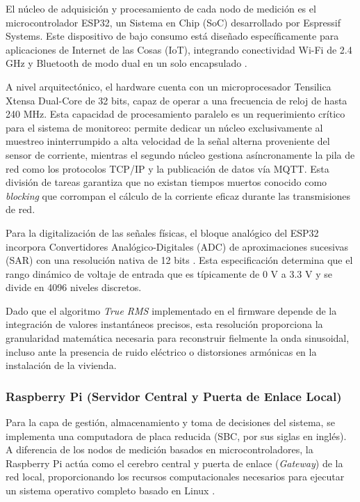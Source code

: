             El núcleo de adquisición y procesamiento de cada nodo de medición es el microcontrolador ESP32, un Sistema en Chip (SoC) desarrollado por Espressif Systems. Este dispositivo de bajo consumo está diseñado específicamente para aplicaciones de Internet de las Cosas (IoT), integrando conectividad Wi-Fi de 2.4 GHz y Bluetooth de modo dual en un solo encapsulado \cite{espressif2023esp32}.

            A nivel arquitectónico, el hardware cuenta con un microprocesador Tensilica Xtensa Dual-Core de 32 bits, capaz de operar a una frecuencia de reloj de hasta 240 MHz. Esta capacidad de procesamiento paralelo es un requerimiento crítico para el sistema de monitoreo: permite dedicar un núcleo exclusivamente al muestreo ininterrumpido a alta velocidad de la señal alterna proveniente del sensor de corriente, mientras el segundo núcleo gestiona asíncronamente la pila de red como los protocolos TCP/IP y la publicación de datos vía MQTT. Esta división de tareas garantiza que no existan tiempos muertos conocido como \textit{blocking} que corrompan el cálculo de la corriente eficaz durante las transmisiones de red.

            Para la digitalización de las señales físicas, el bloque analógico del ESP32 incorpora Convertidores Analógico-Digitales (ADC) de aproximaciones sucesivas (SAR) con una resolución nativa de 12 bits \cite{espressif2023esp32}. Esta especificación determina que el rango dinámico de voltaje de entrada que es típicamente de 0 V a 3.3 V y se divide en 4096 niveles discretos. 

            Dado que el algoritmo \textit{True RMS} implementado en el firmware depende de la integración de valores instantáneos precisos, esta resolución proporciona la granularidad matemática necesaria para reconstruir fielmente la onda sinusoidal, incluso ante la presencia de ruido eléctrico o distorsiones armónicas en la instalación de la vivienda.

        \subsubsection{Raspberry Pi (Servidor Central y Puerta de Enlace Local)}

            Para la capa de gestión, almacenamiento y toma de decisiones del sistema, se implementa una computadora de placa reducida (SBC, por sus siglas en inglés). A diferencia de los nodos de medición basados en microcontroladores, la Raspberry Pi actúa como el cerebro central y puerta de enlace (\textit{Gateway}) de la red local, proporcionando los recursos computacionales necesarios para ejecutar un sistema operativo completo basado en Linux \cite{raspberry2023doc}.

